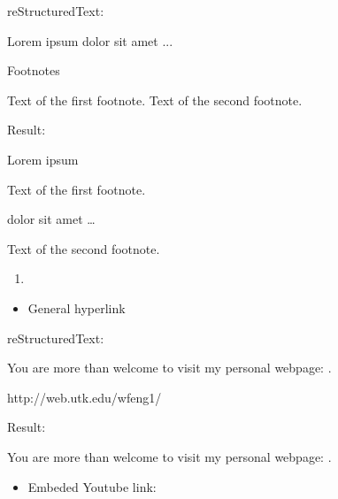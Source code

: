 \documentclass[letterpaper,11pt,english]{sphinxmanual}
\begin{document}
reStructuredText:

\begin{sphinxVerbatim}[commandchars=\\\{\}]
Lorem ipsum  dolor sit amet ... 

  Footnotes

  Text of the first footnote.
  Text of the second footnote.
\end{sphinxVerbatim}

Result:

Lorem ipsum %
\begin{footnote}[1]\sphinxAtStartFootnote
Text of the first footnote.
%
\end{footnote} dolor sit amet … %
\begin{footnote}[2]\sphinxAtStartFootnote
Text of the second footnote.
%
\end{footnote}
\begin{enumerate}
\def\theenumi{\arabic{enumi}}
\def\labelenumi{\theenumi .}
\makeatletter\def\p@enumii{\p@enumi \theenumi .}\makeatother
\setcounter{enumi}{6}
\item {} 

\end{enumerate}
\begin{itemize}
\item {} 
General hyperlink

\end{itemize}

reStructuredText:

\begin{sphinxVerbatim}[commandchars=\\\{\}]
You are more than welcome to visit my personal webpage: .

  http://web.utk.edu/\PYGZti{}wfeng1/
\end{sphinxVerbatim}

Result:

You are more than welcome to visit my personal webpage: .
\begin{itemize}
\item {} 
Embeded Youtube link:

\end{itemize}
\end{document}

